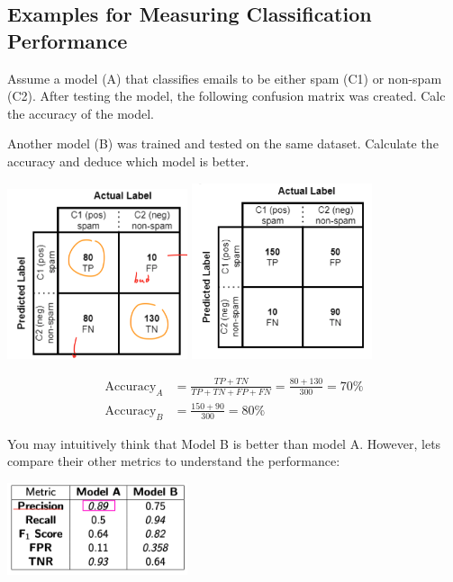 \documentclass{tron}
\begin{document}
\newpage
\subsection{Examples for Measuring Classification Performance}
\vspace{5pt}

\begin{example}{}
	Assume a model (A) that classifies emails to be either spam (C1) or non-spam (C2). After testing the model, the following confusion matrix was created. Calc the accuracy of the model.
	
	Another model (B) was trained and tested on the same dataset. Calculate the accuracy and deduce which model is better.
	
	\includegraphics[width = 200px]{Figs/Lec7/ex1-a}
	\includegraphics[width = 200px]{Figs/Lec7/ex1-b}
	
	\begin{align}
		\text{Accuracy}_A & = \frac{TP + TN}{TP + TN + FP + FN} = \frac{80 + 130}{300} = 70 \% \\
		\text{Accuracy}_B & = \frac{150 + 90}{300} = 80 \% 
	\end{align}
	
	
	You may intuitively think that Model B is better than model A. However, lets compare their other metrics to understand the performance:
	
	\includegraphics[width = 200px]{Figs/Lec7/ex1-table}
	

\end{example}
\end{document}
